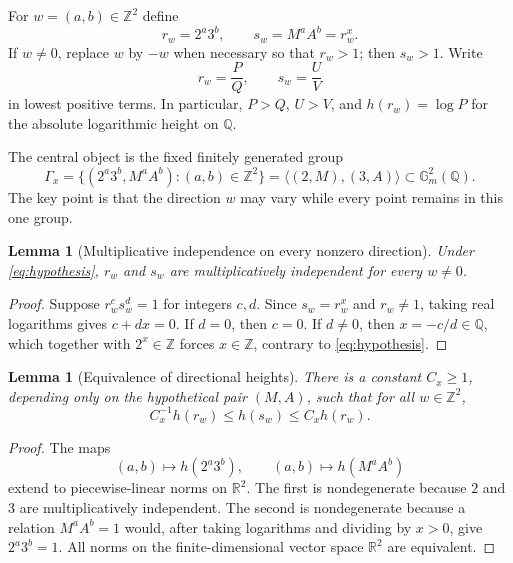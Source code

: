 \documentclass[11pt]{article}
\newtheorem{lemma}[theorem]{Lemma}
\theoremstyle{definition}
\newcommand{\Z}{\mathbb Z}
\newcommand{\Q}{\mathbb Q}
\newcommand{\R}{\mathbb R}
\newcommand{\Gm}{\mathbb G_m}
\begin{document}
For $w=(a,b)\in\Z^2$ define
\begin{equation}
 r_w=2^a3^b,\qquad s_w=M^aA^b=r_w^x.
 \label{eq:direction-pair}
\end{equation}
If $w\ne0$, replace $w$ by $-w$ when necessary so that $r_w>1$; then
$s_w>1$.  Write
\begin{equation}
 r_w=\frac{P}{Q},\qquad s_w=\frac{U}{V}
 \label{eq:reduced-direction}
\end{equation}
in lowest positive terms.  In particular, $P>Q$, $U>V$, and
$h(r_w)=\log P$ for the absolute logarithmic height on $\Q$.

The central object is the fixed finitely generated group
\begin{equation}
 \Gamma_x=\{(2^a3^b,M^aA^b):(a,b)\in\Z^2\}
 =\langle(2,M),(3,A)\rangle\subset\Gm^2(\Q).
 \label{eq:fixed-group}
\end{equation}
The key point is that the direction $w$ may vary while every point remains in
this one group.

\begin{lemma}[Multiplicative independence on every nonzero direction]
\label{lem:direction-independence}
Under \eqref{eq:hypothesis}, $r_w$ and $s_w$ are multiplicatively independent
for every $w\ne0$.
\end{lemma}

\begin{proof}
Suppose $r_w^c s_w^d=1$ for integers $c,d$.  Since $s_w=r_w^x$ and
$r_w\ne1$, taking real logarithms gives $c+dx=0$.  If $d=0$, then $c=0$.
If $d\ne0$, then $x=-c/d\in\Q$, which together with $2^x\in\Z$ forces
$x\in\Z$, contrary to \eqref{eq:hypothesis}.
\end{proof}

\begin{lemma}[Equivalence of directional heights]
\label{lem:norm-equivalence}
There is a constant $C_x\ge1$, depending only on the hypothetical pair
$(M,A)$, such that for all $w\in\Z^2$,
\begin{equation}
 C_x^{-1}h(r_w)\le h(s_w)\le C_x h(r_w).
 \label{eq:norm-equivalence}
\end{equation}
\end{lemma}

\begin{proof}
The maps
\[
 (a,b)\longmapsto h(2^a3^b),\qquad
 (a,b)\longmapsto h(M^aA^b)
\]
extend to piecewise-linear norms on $\R^2$.  The first is nondegenerate because
$2$ and $3$ are multiplicatively independent.  The second is nondegenerate
because a relation $M^aA^b=1$ would, after taking logarithms and dividing by
$x>0$, give $2^a3^b=1$.  All norms on the finite-dimensional vector space
$\R^2$ are equivalent.
\end{proof}
\end{document}
